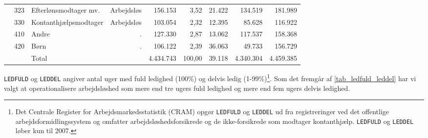 \begin{table}[H]
{\begin{tabular}{@{}l|llrrrrrr@{}}
		&	323	&	Efterlønsmodtager mv.	&	Arbejdsløs	&	156.153	&	3,52	&	21.422	&	134.519	&	181.989	\\	
		&	330	&	Kontanthjælpsmodtager	&	Arbejdsløs	&	103.054	&	2,32	&	12.395	&	85.628	&	116.922	\\	
		&	410	&	Andre	&	.	&	127.330	&	2,87	&	13.062	&	117.537	&	158.368	\\	
		&	420	&	Børn	&	.	&	106.122	&	2,39	&	36.063	&	49.733	&	156.729	\\	
		&		&	Total	&		&	4.434.743	&	100,00	&	39.118	&	4.340.304	&	4.459.385	\\	\bottomrule
\end{tabular} }
\end{table}
% 
\newpage \texttt{LEDFULD} og \texttt{LEDDEL} angiver antal uger med fuld ledighed (100\%) og delvis ledig (1-99\%)\footnote{Det Centrale Register for Arbejdsmarkedsstatistik (CRAM) opgør \texttt{LEDFULD} og \texttt{LEDDEL} ud fra registreringer ved det offentlige arbejdsformidlingssystem og omfatter arbejdsløshedsforsikrede og de ikke-forsikrede som modtager kontanthjælp. \texttt{LEDFULD} og \texttt{LEDDEL} løber kun til 2007.}. Som det fremgår af \ref{tab_ledfuld_leddel} har vi valgt at operationalisere arbejdsløshed som mere end tre ugers fuld ledighed og mere end fem ugers delvis ledighed.
%
